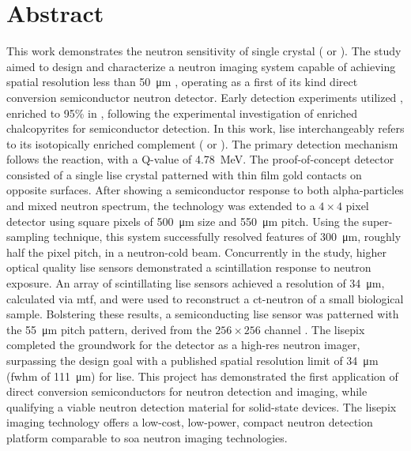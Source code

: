 \documentclass[../main.tex]{subfiles}%
\begin{document}
%
    \chapter*{Abstract}%
    \label{ch:abstract}%
    This work demonstrates the neutron sensitivity of single crystal  ( or  ).
    The study aimed to design and characterize a neutron imaging system capable of achieving spatial resolution less than \SI{50}{\micro\meter} , operating as a first of its kind direct conversion semiconductor neutron detector.
    Early detection experiments utilized , enriched to 95\% in  , following the experimental investigation of enriched chalcopyrites for semiconductor detection.
    In this work, \gls{lise} interchangeably refers to its isotopically enriched complement (  or  ).
    The primary detection mechanism follows the   reaction, with a Q-value of \SI{4.78}{\mega\electronvolt}.
    The proof-of-concept detector consisted of a single \gls{lise} crystal patterned with thin film gold contacts on opposite surfaces.
    After showing a semiconductor response to both \glspl{alpha-particle} and mixed neutron spectrum, the technology was extended to a $4\times 4$ pixel detector using square pixels of \SI{500}{\micro\meter} size and \SI{550}{\micro\meter} pitch.
    Using the \gls{super-sampling} technique, this system successfully resolved features of \SI{300}{\micro\meter}, roughly half the pixel pitch, in a \gls{neutron-cold} beam.
    Concurrently in the study, higher optical quality \gls{lise} sensors demonstrated a scintillation response to neutron exposure.
    An array of scintillating \gls{lise} sensors achieved a resolution of \SI{34}{\micro\meter}, calculated via \gls{mtf}, and were used to reconstruct a \gls{ct-neutron} of a small biological sample.
    Bolstering these results, a semiconducting \gls{lise} sensor was patterned with the \SI{55}{\micro\meter} pitch pattern, derived from the $256\times 256$ channel .
    The \gls{lisepix} completed the groundwork for the detector as a \gls{high-res} neutron imager, surpassing the design goal with a published spatial resolution limit of \SI{34}{\micro\meter} (\gls{fwhm} of \SI{111}{\micro\meter}) for \gls{lise}.
    This project has demonstrated the first application of direct conversion semiconductors for neutron detection and imaging, while qualifying a viable neutron detection material for \gls{solid-state} devices.
    The \gls{lisepix} imaging technology offers a low-cost, low-power, compact neutron detection platform comparable to \gls{soa} neutron imaging technologies.
\end{document}
